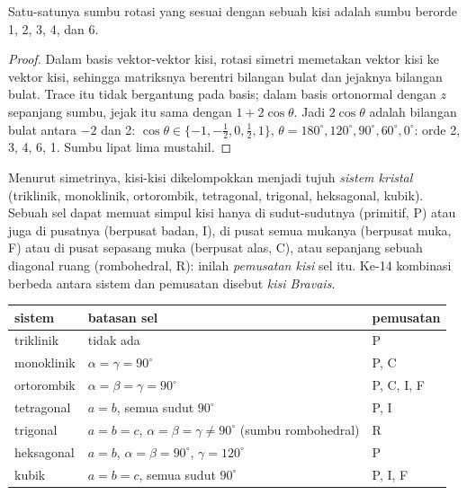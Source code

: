 \begin{theorem}\label{thm:b3:x-ray-diffraction:restriction}
Satu-satunya sumbu rotasi yang sesuai dengan sebuah kisi adalah sumbu berorde
1, 2, 3, 4, dan 6.
\end{theorem}

\begin{proof}
Dalam basis vektor-vektor kisi, rotasi simetri memetakan vektor kisi ke vektor
kisi, sehingga matriksnya berentri bilangan bulat dan jejaknya bilangan bulat.
Trace itu tidak bergantung pada basis; dalam basis ortonormal dengan $z$
sepanjang sumbu, jejak itu sama dengan $1 + 2\cos\theta$. Jadi $2\cos\theta$
adalah bilangan bulat antara $-2$ dan 2:
$\cos\theta \in \{-1, -\frac12, 0, \frac12, 1\}$, $\theta = 180^\circ, 120^\circ, 90^\circ,
60^\circ, 0^\circ$: orde 2, 3, 4, 6, 1. Sumbu lipat lima mustahil.
\end{proof}

\begin{definition}\label{def:b3:x-ray-diffraction:crystal-system}
Menurut simetrinya, kisi-kisi dikelompokkan menjadi tujuh \emph{sistem
kristal} (triklinik, monoklinik, ortorombik, tetragonal,
trigonal, heksagonal, kubik). Sebuah sel dapat memuat simpul kisi hanya di
sudut-sudutnya (primitif, P) atau juga di pusatnya (berpusat badan, I), di
pusat semua mukanya (berpusat muka, F) atau di pusat sepasang muka (berpusat
alas, C), atau sepanjang sebuah diagonal ruang (rombohedral, R): inilah
\emph{pemusatan kisi} sel itu. Ke-14 kombinasi berbeda
antara sistem dan pemusatan disebut \emph{kisi Bravais}.
\end{definition}

\begin{center}\small
\begin{tabular}{lll}
\hline
sistem & batasan sel & pemusatan \\ \hline
triklinik & tidak ada & P \\
monoklinik & $\alpha = \gamma = 90^\circ$ & P, C \\
ortorombik & $\alpha = \beta = \gamma = 90^\circ$ & P, C, I, F \\
tetragonal & $a = b$, semua sudut $90^\circ$ & P, I \\
trigonal & $a = b = c$, $\alpha = \beta = \gamma \ne 90^\circ$ (sumbu rombohedral) & R \\
heksagonal & $a = b$, $\alpha = \beta = 90^\circ$, $\gamma = 120^\circ$ & P \\
kubik & $a = b = c$, semua sudut $90^\circ$ & P, I, F \\ \hline
\end{tabular}
\end{center}

